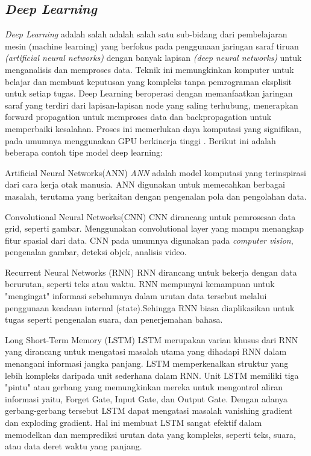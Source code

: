 \subsection{\textit{Deep Learning}}
\textit{Deep Learning} adalah salah adalah salah satu sub-bidang dari pembelajaran mesin (machine learning) yang berfokus pada penggunaan jaringan saraf tiruan \textit{(artificial neural networks)} dengan banyak lapisan \textit{(deep neural networks)} untuk menganalisis dan memproses data. Teknik ini memungkinkan komputer untuk belajar dan membuat keputusan yang kompleks tanpa pemrograman eksplisit untuk setiap tugas\cite{amazonDeepLearning}. Deep Learning beroperasi dengan memanfaatkan jaringan saraf yang terdiri dari lapisan-lapisan node yang saling terhubung, menerapkan forward propagation untuk memproses data dan backpropagation untuk memperbaiki kesalahan. Proses ini memerlukan daya komputasi yang signifikan, pada umumnya menggunakan GPU berkinerja tinggi \cite{ibmWhatDeep}. Berikut ini adalah beberapa contoh tipe model deep learning:
\begin{packed_item}
	\item Artificial Neural Networks(ANN)
	 \textit{ANN} adalah model komputasi yang terinspirasi dari cara kerja otak manusia. ANN digunakan untuk memecahkan berbagai masalah, terutama yang berkaitan dengan pengenalan pola dan pengolahan data. 
	\item Convolutional Neural Networks(CNN)
	CNN dirancang untuk pemrosesan data grid, seperti gambar. Menggunakan convolutional layer yang mampu menangkap fitur spasial dari data. CNN pada umumnya digunakan pada \textit{computer vision}, pengenalan gambar, deteksi objek, analisis video. 
	\item Recurrent Neural Networks (RNN)
	RNN dirancang untuk bekerja dengan data berurutan, seperti teks atau waktu. RNN mempunyai kemampuan untuk "mengingat" informasi sebelumnya  dalam urutan data tersebut melalui penggunaan keadaan internal (state).Sehingga RNN biasa diaplikasikan untuk tugas seperti pengenalan suara, dan penerjemahan bahasa. 
	\item Long Short-Term Memory (LSTM)
	LSTM merupakan varian khusus dari RNN yang dirancang untuk mengatasi masalah utama yang dihadapi RNN dalam menangani informasi jangka panjang. LSTM memperkenalkan struktur yang lebih kompleks daripada unit sederhana dalam RNN. Unit LSTM memiliki tiga "pintu" atau gerbang yang memungkinkan mereka untuk mengontrol aliran informasi yaitu, Forget Gate, Input Gate, dan Output Gate. Dengan adanya gerbang-gerbang tersebut  LSTM dapat mengatasi masalah vanishing gradient dan exploding gradient.  Hal ini membuat LSTM sangat efektif dalam memodelkan dan memprediksi urutan data yang kompleks, seperti teks, suara, atau data deret waktu yang panjang.
\end{packed_item}

